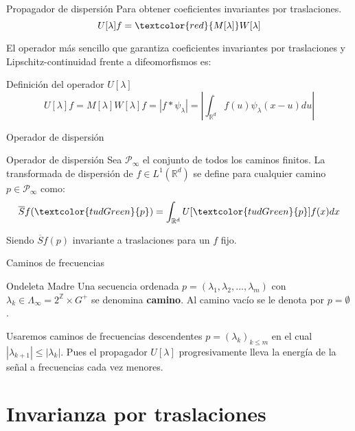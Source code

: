 \documentclass[aspectratio=43]{beamer}
\begin{document}
\begin{frame}{Propagador de dispersión}
  Para obtener coeficientes invariantes por traslaciones. 
  $$U[\lambda]f= \textcolor{red}{M[\lambda]} W[\lambda]$$

  \medskip

  El operador más sencillo que garantiza coeficientes invariantes por traslaciones y Lipschitz-continuidad frente a difeomorfismos es:

  \begin{block}{Definición del operador $U[\lambda]$}
    $$U[\lambda]f=M[\lambda]W[\lambda]f=|f \ast \psi_\lambda|=\left | \int_{\mathbb{R}^d} f(u)\psi_\lambda(x-u) du \right|$$
  \end{block}
\end{frame}

\begin{frame}{Operador de dispersión}
  \begin{alertblock}{Operador de dispersión}
    Sea \textcolor{tudGreen}{$\mathcal{P}_\infty$} el conjunto de todos los caminos finitos. La transformada de dispersión de $f \in L^1(\mathbb{R}^d)$ se define para cualquier camino \textcolor{tudGreen}{$p \in \mathcal{P}_\infty$} como:
    \begin{equation}
      \overline{S}f(\textcolor{tudGreen}{p})=\int_{\mathbb{R}^d}U[\textcolor{tudGreen}{p}]f(x)dx 
    \end{equation}
  \end{alertblock}
  
  Siendo $\overline{S}f(p)$ invariante a traslaciones para un $f$ fijo.
\end{frame}

\begin{frame}{Caminos de frecuencias}
  \begin{block}{Ondeleta Madre}
    Una secuencia ordenada $p=(\lambda_1,\lambda_2, \ldots , \lambda_m)$ con $\lambda_k \in \Lambda_\infty=2^{\mathbb{Z}} \times G^{+} $ se denomina \textbf{camino}. Al camino vacío se le denota por $p=\emptyset$. 
  \end{block}
  
  Usaremos caminos de frecuencias descendentes $p=(\lambda_k)_{k\leq m}$ en el cual $|\lambda_{k+1}| \leq |\lambda_k|$. Pues el propagador $U[\lambda]$ progresivamente lleva la energía de la señal a frecuencias cada vez menores.
\end{frame}

\section{Invarianza por traslaciones}
\end{document}
